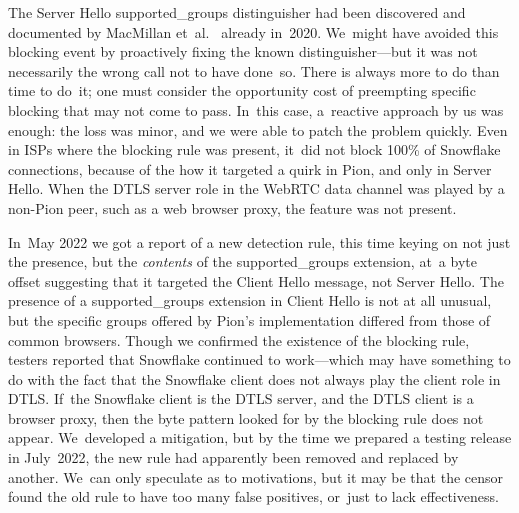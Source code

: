 \documentclass[letterpaper,twocolumn]{article}
\begin{document}
The Server Hello \mbox{supported\_groups} distinguisher
had been
discovered and documented by MacMillan et~al.~\cite[\S 3]{arxiv.2008.03254}
already in~2020.
We~might have avoided this blocking event by proactively fixing
the known distinguisher---but
it was not necessarily the wrong call not to have done~so.
There is always more to do than time to do~it;
one must consider the opportunity cost
of preempting specific blocking that may not come to pass.
In~this case, a~reactive approach by us was enough:
the loss was minor, and we were able to patch the problem quickly.
Even in ISPs where the blocking rule was present,
it~did not block 100\% of Snowflake connections,
because of the how it targeted a quirk in Pion,
and only in Server Hello.
When the DTLS server role in the WebRTC data channel
was played by a non-Pion peer,
such as a web browser proxy,
the feature was not present.


In~May 2022 we got a report of a new detection rule,
this time keying on not just the presence, but the \emph{contents}
of the \mbox{supported\_groups} extension,
at~a byte offset suggesting that
it targeted the Client Hello message,
not Server Hello.
The presence of a \mbox{supported\_groups} extension in Client Hello is not at all unusual,
but the specific groups offered by Pion's implementation
differed from those of common browsers.
Though we confirmed the existence of the blocking rule,
testers reported that Snowflake continued to work---which
may have something to do with the fact that the Snowflake client
does not always play the client role in DTLS.
If~the Snowflake client is the DTLS server,
and the DTLS client is a browser proxy,
then the byte pattern looked for by the blocking rule does not appear.
We~developed a mitigation,
but by the time we prepared a testing release in July~2022,
the new rule
had apparently been removed
and replaced by another.
We~can only speculate as to motivations,
but it may be that the censor found the old rule
to have too many false positives,
or~just to lack effectiveness.
\end{document}
